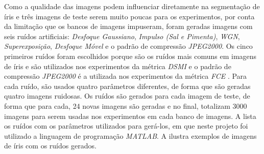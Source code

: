 \par Como a qualidade das imagens podem influenciar diretamente na segmentação de íris e três imagens de teste serem muito poucas para os experimentos, por conta da limitação que os bancos de imagens impuseram, foram geradas imagens com seis ruídos artificiais: \textit{Desfoque Gaussiano}, \textit{Impulso (Sal e Pimenta)}, \textit{\acrfull{WGN}}, \textit{Superexposição}, \textit{Desfoque Móvel} e o padrão de compressão \textit{JPEG2000}. Os cinco primeiros ruídos foram escolhidos porque são os ruídos mais comuns em imagens de íris e são utilizados nos experimentos da métrica \textit{\acrshort{DSMI}} \cite{Jenadeleh_2018_CVPR_Workshops} e o padrão de compressão \textit{JPEG2000} é a utilizada nos experimentos da métrica \textit{\acrshort{FCE}} \cite{du2010}. Para cada ruído, são usados quatro parâmetros diferentes, de forma que são geradas quatro imagens ruidosas. Os ruídos são gerados para cada imagem de teste, de forma que para cada, 24 novas imagens são geradas e no final, totalizam 3000 imagens para serem usadas nos experimentos em cada banco de imagens.  A  lista os ruídos com os parâmetros utilizados para gerá-los, em que neste projeto foi utilizado a linguagem de programação \textit{MATLAB}. A  ilustra exemplos de imagens de íris com os ruídos gerados.


